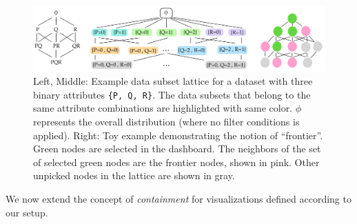 \begin{figure}[ht!]
\includegraphics[width=\linewidth]{figures/lattice_frontier.png}
\caption{Left, Middle: Example data subset lattice for a dataset with three binary attributes {\tt \{P, Q, R\}}. The data subsets that belong to the same attribute combinations are highlighted with same color. $\phi$ represents the overall distribution (where no filter conditions is applied). Right: Toy example demonstrating the notion of ``frontier''. Green nodes are selected in the dashboard. The neighbors of the set of selected green nodes are the frontier nodes, shown in pink. Other unpicked nodes in the lattice are shown in gray.}
\label{fig:lattice}
\end{figure}
We now extend the concept of \emph{containment} for visualizations defined according to our setup.




